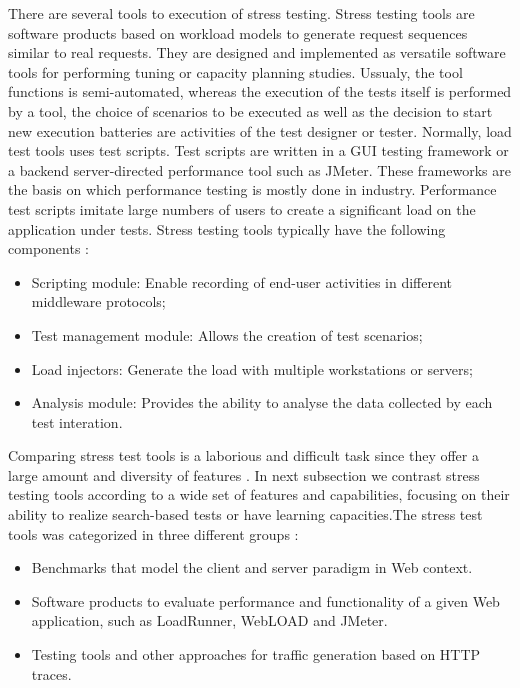 \documentclass{report}
\begin{document}
There are several tools to execution of stress testing. Stress testing tools are software products based on workload models to generate request sequences similar to real requests. They are designed and implemented as versatile software tools for performing tuning or capacity planning studies. Ussualy, the tool functions is semi-automated, whereas the execution of the tests itself is performed by a tool, the choice of scenarios to be executed as well as the decision to start new execution batteries are activities of the test designer or tester. Normally, load test tools uses test scripts. Test scripts are written in a GUI testing framework or a backend server-directed performance tool such as JMeter. These frameworks are the basis on which performance testing is mostly done in industry. Performance test scripts imitate large numbers of users to create a significant load on the application under tests. Stress testing tools typically have the following components \cite{Grechanik2012} \cite{Molyneaux2009}:

\begin{itemize}
\item Scripting module: Enable recording of end-user activities in different middleware protocols;
\item Test management module: Allows the creation of test scenarios;
\item Load injectors: Generate the load with multiple workstations or servers;
\item Analysis module: Provides the ability to analyse the data collected by each test interation.
\end{itemize}


Comparing stress test tools is a laborious and difficult task since they offer a large amount and diversity of features \cite{Dustin1999}. In next subsection we contrast stress testing tools according to a wide set of features and capabilities, focusing on their ability to realize search-based tests or have learning capacities.The stress test tools was categorized in three different groups \cite{MohammadS.Obaidat}:

\begin{itemize}
\item Benchmarks that model the client and server paradigm in Web context. 
\item Software products to evaluate performance and functionality of a given Web application, such as LoadRunner, WebLOAD and JMeter.
\item Testing tools and other approaches for traffic generation based on HTTP traces.
\end{itemize}
\end{document}
